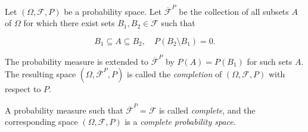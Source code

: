Let $(\Omega, \mathcal{F}, P)$ be a probability space. Let $\overline{\mathcal{F}}^P$ be the collection of all subsets $A$ of $\Omega$ for which there exist sets $B_1, B_2 \in \mathcal{F}$ such that

$$B_1 \subseteq A \subseteq B_2, \quad P(B_2 \setminus B_1) = 0.$$

The probability measure is extended to $\overline{\mathcal{F}}^P$ by $P(A) = P(B_1)$ for such sets $A$. The resulting space $(\Omega, \overline{\mathcal{F}}^P, P)$ is called the \textit{completion} of $(\Omega, \mathcal{F}, P)$ with respect to $P$.

A probability measure such that $\overline{\mathcal{F}}^P = \mathcal{F}$ is called \textit{complete}, and the corresponding space $(\Omega, \mathcal{F}, P)$ is a \textit{complete probability space}.
